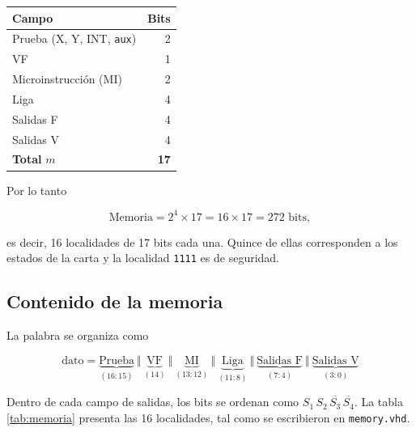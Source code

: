\begin{center}
\begin{tabular}{@{}l r@{}}
\toprule
\textbf{Campo} & \textbf{Bits} \\
\midrule
Prueba (X, Y, INT, \texttt{aux})      & 2 \\
VF                                    & 1 \\
Microinstrucción (MI)                 & 2 \\
Liga                                  & 4 \\
Salidas F                             & 4 \\
Salidas V                             & 4 \\
\midrule
\textbf{Total} $m$                    & \textbf{17} \\
\bottomrule
\end{tabular}
\end{center}

Por lo tanto

\[
\text{Memoria} = 2^{4} \times 17 = 16 \times 17 = 272 \text{ bits},
\]

es decir, 16 localidades de 17 bits cada una. Quince de ellas corresponden a los estados de la carta
y la localidad \texttt{1111} es de seguridad.

\subsection{Contenido de la memoria}

La palabra se organiza como

\[
\text{dato} = \underbrace{\text{Prueba}}_{(16{:}15)} \ \Vert \
\underbrace{\text{VF}}_{(14)} \ \Vert \
\underbrace{\text{MI}}_{(13{:}12)} \ \Vert \
\underbrace{\text{Liga}}_{(11{:}8)} \ \Vert \
\underbrace{\text{Salidas F}}_{(7{:}4)} \ \Vert \
\underbrace{\text{Salidas V}}_{(3{:}0)}
\]

Dentro de cada campo de salidas, los bits se ordenan como $S_1\, S_2\, \overline{S_3}\, \overline{S_4}$.
La tabla \ref{tab:memoria} presenta las 16 localidades, tal como se escribieron en \texttt{memory.vhd}.

